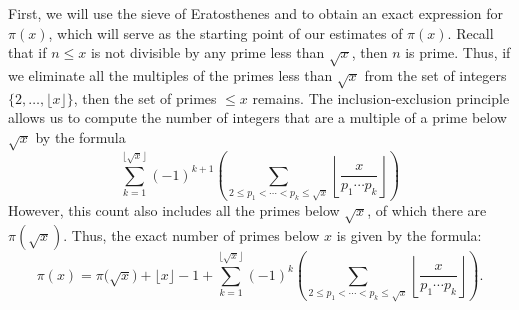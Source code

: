 First, we will use the sieve of Eratosthenes and  to obtain an exact expression for $\pi(x)$, which will serve as the starting point of our estimates of $\pi(x)$. Recall that if $n\leq x$ is not divisible by any prime less than $\sqrt{x}$, then $n$ is prime. Thus, if we eliminate all the multiples of the primes less than $\sqrt{x}$ from the set of integers $\{2,\ldots,\lfloor x\rfloor\}$, then the set of primes $\leq x$ remains. The inclusion-exclusion principle allows us to compute the number of integers that are a multiple of a prime below $\sqrt{x}$ by the formula
\begin{equation*}
  \sum_{k=1}^{\lfloor\sqrt{x}\rfloor}(-1)^{k+1}\left(\sum_{2\leq p_1<\cdots <p_k\leq \sqrt{x}}\left\lfloor\frac{x}{p_1\cdots p_k}\right\rfloor\right)
\end{equation*}
However, this count also includes all the primes below $\sqrt{x}$, of which there are $\pi(\sqrt{x})$. Thus, the exact number of primes below $x$ is given by the formula:
\begin{equation*}
  \pi(x)= \pi\bigl(\sqrt{x}\bigr) + \lfloor x\rfloor - 1 + \sum_{k=1}^{\lfloor\sqrt{x}\rfloor}(-1)^{k}\left(\sum_{2\leq p_1<\cdots <p_k\leq \sqrt{x}}\left\lfloor\frac{x}{p_1\cdots p_k}\right\rfloor\right).
\end{equation*}


